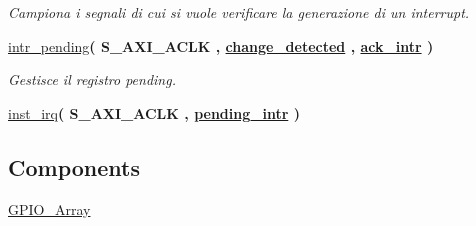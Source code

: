 \begin{DoxyCompactItemize}
\begin{DoxyCompactList}\small\item\em Campiona i segnali di cui si vuole verificare la generazione di un interrupt. \end{DoxyCompactList}\item 
\hyperlink{classGPIO__v1__0__S00__AXI_1_1arch__imp_a72db935ad9e80a3434cfb113c364c329}{intr\+\_\+pending}{\bfseries  ( {\bfseries \textcolor{vhdlchar}{S\+\_\+\+A\+X\+I\+\_\+\+A\+C\+LK}\textcolor{vhdlchar}{ }} , {\bfseries {\bfseries \hyperlink{classGPIO__v1__0__S00__AXI_1_1arch__imp_aab51abc2eb680c6f972e0d63ab4fc591}{change\+\_\+detected}} \textcolor{vhdlchar}{ }} , {\bfseries {\bfseries \hyperlink{classGPIO__v1__0__S00__AXI_1_1arch__imp_a0d3233e5bd28024e266252af0b862923}{ack\+\_\+intr}} \textcolor{vhdlchar}{ }} )}
\begin{DoxyCompactList}\small\item\em Gestisce il registro pending. \end{DoxyCompactList}\item 
\hyperlink{classGPIO__v1__0__S00__AXI_1_1arch__imp_a48d068c63e454a766cd9703aff942fb6}{inst\+\_\+irq}{\bfseries  ( {\bfseries \textcolor{vhdlchar}{S\+\_\+\+A\+X\+I\+\_\+\+A\+C\+LK}\textcolor{vhdlchar}{ }} , {\bfseries {\bfseries \hyperlink{classGPIO__v1__0__S00__AXI_1_1arch__imp_a0bf0e620e2340340488f0616eae3242a}{pending\+\_\+intr}} \textcolor{vhdlchar}{ }} )}
\end{DoxyCompactItemize}
\subsection*{Components}
 \begin{DoxyCompactItemize}
\item 
\mbox{\label{classGPIO__v1__0__S00__AXI_1_1arch__imp_a7f7f55a1fb49e8857e13928560e7c192}} 
\hyperlink{classGPIO__v1__0__S00__AXI_1_1arch__imp_a7f7f55a1fb49e8857e13928560e7c192}{G\+P\+I\+O\+\_\+\+Array}  {\bfseries }  
\end{DoxyCompactItemize}
